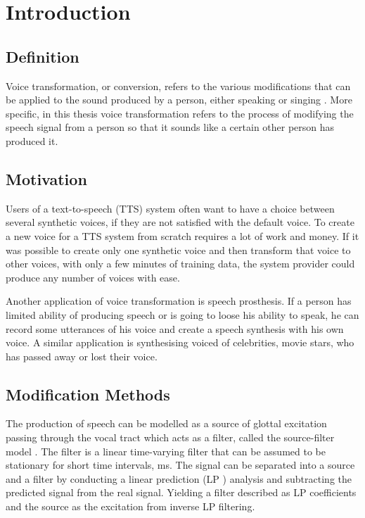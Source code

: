 \chapter{Introduction} %
\label{cha:introduction}

\section{Definition} %
\label{sec:definition}
Voice transformation, or conversion, refers to the various modifications that can be applied to the sound produced by a person, either speaking or singing \cite{stylianou08}. More specific, in this thesis voice transformation refers to the process of modifying the speech signal from a person so that it sounds like a certain other person has produced it. 

\section{Motivation} %
\label{sec:motivation}
Users of a text-to-speech (TTS) system often want to have a choice between several synthetic voices, if they are not satisfied with the default voice. To create a new voice for a TTS system from scratch requires a lot of work and money. If it was possible to create only one synthetic voice and then transform that voice to other voices, with only a few minutes of  training data, the system provider could produce any number of voices with ease. 

Another application of voice transformation is speech prosthesis. If a person has limited ability of producing speech or is going to loose his ability to speak, he can record some utterances of his voice and create a speech synthesis with his own voice. A similar application is synthesising voiced of celebrities, \eg movie stars, who has passed away or lost their voice.

\section{Modification Methods} %
\label{sec:synthesis_methods}
The production of speech can be modelled as a source of glottal excitation passing through the vocal tract which acts as a filter, called the source-filter model \cite{taletek}. The filter is a linear time-varying filter that can be assumed to be stationary for short time intervals,  ms. The signal can be separated into a source and a filter by conducting a linear prediction (LP ) analysis and subtracting the predicted signal from the real signal. Yielding a filter described as LP coefficients and the source as the excitation from inverse LP filtering.

